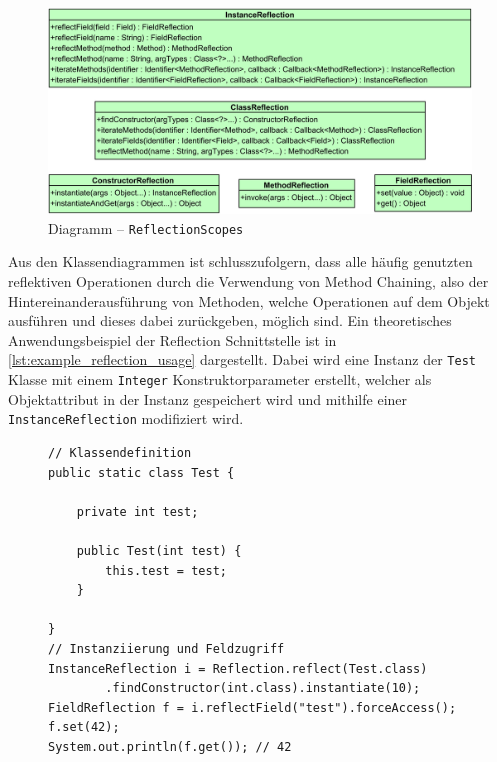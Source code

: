 \begin{figure}[H]
	\centering
	\includegraphics[width=\textwidth]{Abbildungen/ReflectionScopes.png}
	\caption{Diagramm -- \texttt{ReflectionScopes}}
	\label{fig:reflection_scopes}
\end{figure}
\noindent Aus den Klassendiagrammen ist schlusszufolgern, dass alle häufig genutzten reflektiven Operationen durch die Verwendung von Method Chaining, also der Hintereinanderausführung von Methoden, welche Operationen auf dem Objekt ausführen und dieses dabei zurückgeben, möglich sind. Ein theoretisches Anwendungsbeispiel der Reflection Schnittstelle ist in \autoref{lst:example_reflection_usage} dargestellt. Dabei wird eine Instanz der \texttt{Test} Klasse mit einem \texttt{Integer} Konstruktorparameter erstellt, welcher als Objektattribut in der Instanz gespeichert wird und mithilfe einer \texttt{InstanceReflection} modifiziert wird.
\begin{figure}[H]
	\begin{lstlisting}[caption={Beispiel -- Verwendung der Reflection Schnittstelle}, captionpos=b, label=lst:example_reflection_usage]
// Klassendefinition
public static class Test {

	private int test;

	public Test(int test) {
		this.test = test;
	}

}
// Instanziierung und Feldzugriff
InstanceReflection i = Reflection.reflect(Test.class)
		.findConstructor(int.class).instantiate(10);
FieldReflection f = i.reflectField("test").forceAccess();
f.set(42);
System.out.println(f.get()); // 42
	\end{lstlisting}
\end{figure}
